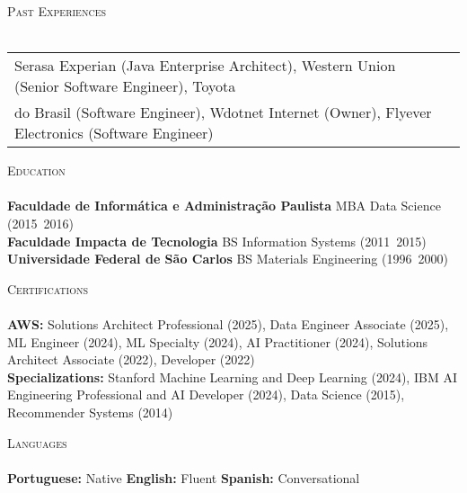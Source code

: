 \documentclass[a4paper]{article}
\newcommand{\lineunder} {
    \vspace*{-8pt} \\
    \hspace*{-18pt} \hrulefill \\
}
\newcommand{\header} [1] {
    {\hspace*{-18pt}\vspace*{6pt} \textsc{#1}}
    \vspace*{-6pt} \lineunder
}
\begin{document}
\header{Past Experiences}
\vspace{0.75mm}
\begin{tabular}{ @{}l l }
    Serasa Experian (Java Enterprise Architect), Western Union (Senior Software Engineer), Toyota \\ do Brasil (Software Engineer), Wdotnet Internet (Owner), Flyever Electronics (Software Engineer) \\
\end{tabular}

\header{Education}
\vspace{0.5mm}
\textbf{Faculdade de Informática e Administração Paulista} \hfill MBA Data Science (2015~2016) \\
\textbf{Faculdade Impacta de Tecnologia} \hfill BS Information Systems (2011~2015) \\
\textbf{Universidade Federal de São Carlos} \hfill BS Materials Engineering (1996~2000) \\
\vspace{0.5mm}

\header{Certifications}
\vspace{0.5mm}
\textbf{AWS:} Solutions Architect Professional (2025), Data Engineer Associate (2025), ML Engineer (2024), ML Specialty (2024), AI Practitioner (2024), Solutions Architect Associate (2022), Developer (2022) \\
\textbf{Specializations:} Stanford Machine Learning and Deep Learning (2024), IBM AI Engineering Professional and AI Developer (2024), Data Science (2015), Recommender Systems (2014)

\header{Languages}
\vspace{0.5mm}
\textbf{Portuguese:} Native \hfill \textbf{English:} Fluent \hfill \textbf{Spanish:} Conversational
\end{document}
